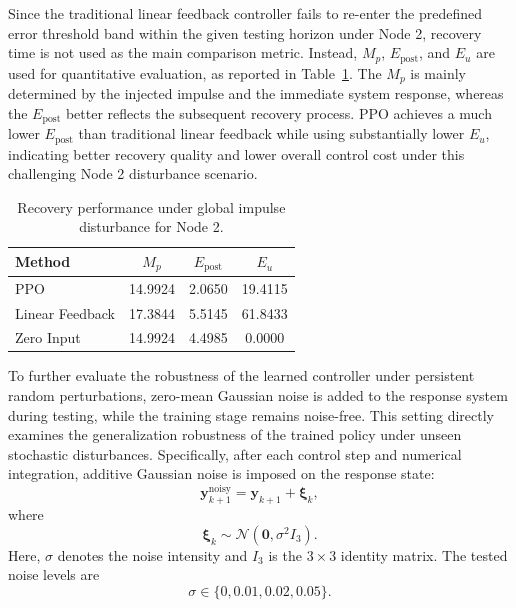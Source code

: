 \documentclass[10pt,twocolumn]{article}
\theoremstyle{definition}
\begin{document}
Since the traditional linear feedback controller fails to re-enter the predefined error threshold band within the given testing horizon under Node 2, recovery time is not used as the main comparison metric. Instead, $M_p$, $E_{\mathrm{post}}$, and $E_u$ are used for quantitative evaluation, as reported in Table~\ref{tab:pulse_node2}. The $M_p$ is mainly determined by the injected impulse and the immediate system response, whereas the $E_{\mathrm{post}}$ better reflects the subsequent recovery process. PPO achieves a much lower $E_{\mathrm{post}}$ than traditional linear feedback while using substantially lower $E_u$, indicating better recovery quality and lower overall control cost under this challenging Node 2 disturbance scenario.

\begin{table}[htbp]
	\centering
	\setlength{\tabcolsep}{2pt}
	\renewcommand{\arraystretch}{1.12}
	\caption{Recovery performance under global impulse disturbance for Node 2.}
	\label{tab:pulse_node2}
	\begin{tabular}{@{}lccc@{}}
		\toprule
		Method & $M_p$ & $E_{\mathrm{post}}$ & $E_u$ \\
		\midrule
		PPO & 14.9924 & 2.0650 & 19.4115 \\
		Linear Feedback & 17.3844 & 5.5145 & 61.8433 \\
		Zero Input & 14.9924 & 4.4985 & 0.0000 \\
		\bottomrule
	\end{tabular}
\end{table}

To further evaluate the robustness of the learned controller under persistent random perturbations, zero-mean Gaussian noise is added to the response system during testing, while the training stage remains noise-free. This setting directly examines the generalization robustness of the trained policy under unseen stochastic disturbances. Specifically, after each control step and numerical integration, additive Gaussian noise is imposed on the response state:
\begin{equation}
	\mathbf{y}_{k+1}^{\mathrm{noisy}}
	=
	\mathbf{y}_{k+1}
	+
	\boldsymbol{\xi}_k,
	\label{eq:gaussian_noise_state}
\end{equation}
where
\begin{equation}
	\boldsymbol{\xi}_k\sim \mathcal{N}(\mathbf{0},\sigma^2 I_3).
	\label{eq:gaussian_noise_distribution}
\end{equation}
Here, $\sigma$ denotes the noise intensity and $I_3$ is the $3\times 3$ identity matrix. The tested noise levels are
\begin{equation}
	\sigma\in\{0,0.01,0.02,0.05\}.
	\label{eq:noise_levels}
\end{equation}
\end{document}
